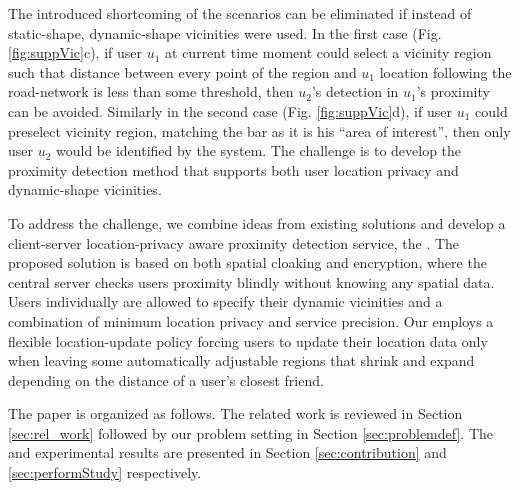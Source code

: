 The introduced shortcoming of the scenarios can be eliminated if instead of
static-shape, dynamic-shape vicinities were used. In the first case (Fig.
\ref{fig:suppVic}c), if user $u_1$ at current time moment could select a
vicinity region such that distance between every point of the region and $u_1$
location following the road-network is less than some threshold, then $u_2$'s
detection in $u_1$'s proximity can be avoided. Similarly in the second case
(Fig. \ref{fig:suppVic}d), if user $u_1$ could preselect vicinity region,
matching the bar as it is his ``area of interest'', then only user $u_2$ would
be identified by the system. The challenge is to develop the proximity detection
method that supports both user location privacy and dynamic-shape vicinities. 

To address the challenge, we combine ideas from existing solutions and develop a
client-server location-privacy aware proximity detection service, the \vl. The
proposed solution is based on both spatial cloaking and encryption, where the
central server checks users proximity blindly without knowing any spatial data. 
Users individually are allowed to specify their dynamic vicinities and a
combination of minimum location privacy and service precision. 
Our \vl employs a flexible location-update policy forcing users to update their
location data only when leaving some automatically adjustable regions that
shrink and expand depending on the distance of a user's closest friend.

The paper is organized as follows. The related work is reviewed in
Section \ref{sec:rel_work} followed by our problem setting in
Section \ref{sec:problemdef}. The \vl and experimental results are
presented in Section \ref{sec:contribution} and \ref{sec:performStudy}
respectively.
